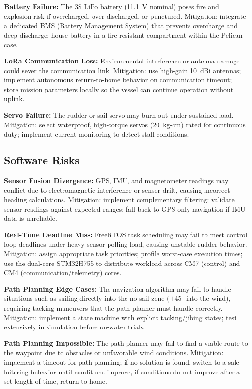 \textcolor{riskyellow}{\textbf{Battery Failure:}} The 3S LiPo battery (11.1~V nominal) poses fire and explosion risk if overcharged, over-discharged, or punctured. Mitigation: integrate a dedicated BMS (Battery Management System) that prevents overcharge and deep discharge; house battery in a fire-resistant compartment within the Pelican case.

\textcolor{riskyellow}{\textbf{LoRa Communication Loss:}} Environmental interference or antenna damage could sever the communication link. Mitigation: use high-gain 10~dBi antennas; implement autonomous return-to-home behavior on communication timeout; store mission parameters locally so the vessel can continue operation without uplink.

\textcolor{riskgreen}{\textbf{Servo Failure:}} The rudder or sail servo may burn out under sustained load. Mitigation: select waterproof, high-torque servos (20~kg-cm) rated for continuous duty; implement current monitoring to detect stall conditions.


\subsection{Software Risks}

\textcolor{riskgreen}{\textbf{Sensor Fusion Divergence:}} GPS, IMU, and magnetometer readings may conflict due to electromagnetic interference or sensor drift, causing incorrect heading calculations. Mitigation: implement complementary filtering; validate sensor readings against expected ranges; fall back to GPS-only navigation if IMU data is unreliable.

\textcolor{riskgreen}{\textbf{Real-Time Deadline Miss:}} FreeRTOS task scheduling may fail to meet control loop deadlines under heavy sensor polling load, causing unstable rudder behavior. Mitigation: assign appropriate task priorities; profile worst-case execution times; use the dual-core STM32H755 to distribute workload across CM7 (control) and CM4 (communication/telemetry) cores.

\textcolor{riskyellow}{\textbf{Path Planning Edge Cases:}} The navigation algorithm may fail to handle situations such as sailing directly into the no-sail zone ($\pm45^{\circ}$ into the wind), requiring tacking maneuvers that the path planner must handle correctly. Mitigation: implement a state machine with explicit tacking/jibing states; test extensively in simulation before on-water trials.

\textcolor{riskgreen}{\textbf{Path Planning Impossible:}} The path planner may fail to find a viable route to the waypoint due to obstacles or unfavorable wind conditions. Mitigation: implement a timeout for path planning; if no solution is found, switch to a safe loitering behavior until conditions improve, if conditions do not improve after a set length of time, return to home.

